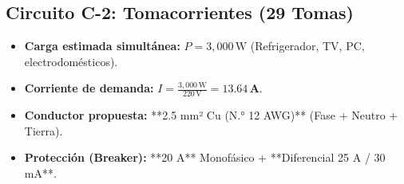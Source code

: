 \documentclass[11pt,a4paper]{article}
\begin{document}
\subsection*{Circuito C-2: Tomacorrientes (29 Tomas)}
\begin{itemize}
    \item \textbf{Carga estimada simultánea:} $P = 3,000\,\text{W}$ (Refrigerador, TV, PC, electrodomésticos).
    \item \textbf{Corriente de demanda:} $I = \frac{3,000\,\text{W}}{220\,\text{V}} = \mathbf{13.64\,\text{A}}$.
    \item \textbf{Conductor propuesta:} **2.5 mm² Cu (N.° 12 AWG)** (Fase + Neutro + Tierra).
    \item \textbf{Protección (Breaker):} **20 A** Monofásico + **Diferencial 25 A / 30 mA**.
\end{itemize}
\end{document}
